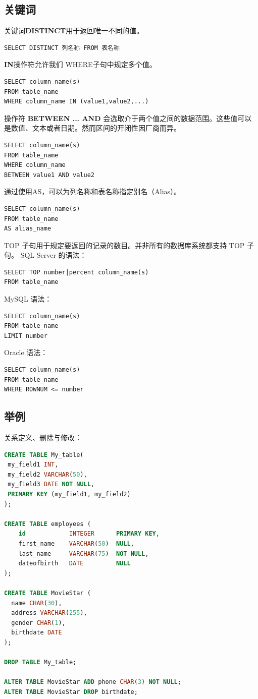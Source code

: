 \subsection{关键词}
关键词\textbf{DISTINCT}用于返回唯一不同的值。
\begin{verbatim}
SELECT DISTINCT 列名称 FROM 表名称
\end{verbatim}


\textbf{IN}操作符允许我们 WHERE子句中规定多个值。

\begin{verbatim}
SELECT column_name(s)
FROM table_name
WHERE column_name IN (value1,value2,...)
\end{verbatim}

操作符 \textbf{BETWEEN ... AND} 会选取介于两个值之间的数据范围。这些值可以是数值、文本或者日期。然而区间的开闭性因厂商而异。

\begin{verbatim}
SELECT column_name(s)
FROM table_name
WHERE column_name
BETWEEN value1 AND value2
\end{verbatim}

通过使用AS，可以为列名称和表名称指定别名（Alias）。

\begin{verbatim}
SELECT column_name(s)
FROM table_name
AS alias_name
\end{verbatim}

TOP 子句用于规定要返回的记录的数目。并非所有的数据库系统都支持 TOP 子句。
SQL Server 的语法： 
\begin{verbatim}
SELECT TOP number|percent column_name(s)
FROM table_name
\end{verbatim}

MySQL 语法：
\begin{verbatim}
SELECT column_name(s)
FROM table_name
LIMIT number
\end{verbatim}

Oracle 语法：
\begin{verbatim}
SELECT column_name(s)
FROM table_name
WHERE ROWNUM <= number
\end{verbatim}


\subsection{举例}

关系定义、删除与修改：
\begin{lstlisting}[language=SQL]
CREATE TABLE My_table(
 my_field1 INT,
 my_field2 VARCHAR(50),
 my_field3 DATE NOT NULL,
 PRIMARY KEY (my_field1, my_field2)
);

CREATE TABLE employees (
    id            INTEGER      PRIMARY KEY,
    first_name    VARCHAR(50)  NULL,
    last_name     VARCHAR(75)  NOT NULL,
    dateofbirth   DATE         NULL
);

CREATE TABLE MovieStar (
  name CHAR(30),
  address VARCHAR(255),
  gender CHAR(1),
  birthdate DATE
);

DROP TABLE My_table;

ALTER TABLE MovieStar ADD phone CHAR(3) NOT NULL;
ALTER TABLE MovieStar DROP birthdate;
\end{lstlisting}

